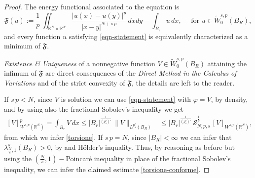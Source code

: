 \documentclass{amsart}
\theoremstyle{definition}
\numberwithin{equation}{section}
\begin{document}
\begin{proof}
	The energy functional associated to the equation is 
	\[
	\mathfrak{F}(u) := \frac{1}{p}\,\iint_{\mathbb{R}^N \times \mathbb{R}^N} \frac{|u(x) - u(y)|^p}{|x-y|^{N+s\,p}} \,dxdy - \int_{B_r} u\,dx, \quad \mbox{ for } u \in \widetilde{{W}}^{s,p}_0(B_R),
	\]
	and every function $u$ satisfying \eqref{eqn-statement} is equivalently characterized as a minimum of $\mathfrak{F}$. 
\par 
	{\it Existence \& Uniqueness} of a nonnegative function $V \in \widetilde{{W}}^{s,p}_0(B_R)$ attaining the infimum of $\mathfrak{F}$ are direct consequences of the {\it Direct Method in the Calculus of Variations} and of the strict convexity of $\mathfrak{F}$, the details are left to the reader.
	\par 
	If $s\,p < N$, since $V$ is solution we can use \eqref{eqn-statement} with $\varphi = V$, by density, and by using also the fractional Sobolev's inequality we get
	\[
	\begin{aligned}
		[V]_{W^{s, p}(\mathbb{R}^N)}^p=\int_{B_r} V\,d x \leq |B_r|^{\frac{1}{(p^*_s)'}}\,\|V\|_{L^{p^*_s}(B_R)} & \leq |B_r|^{\frac{1}{(p^*_s)'}}\,\mathcal{S}_{N, p, s}^{\frac{1}{p}}\,[V]_{W^{s,p}(\mathbb{R}^N)},
	\end{aligned}
	\]
	from which we infer \eqref{torsione}. If $s\,p= N$, since $|B_R| < \infty$ we can infer that $\lambda_{\frac{N}{s},1}^s(B_R) > 0$, by \cite[Lemma 2.4]{BLP} and H\"older's inquality. Thus, by reasoning as before but using the $\left(\frac{N}{s}, 1\right)-$Poincar\'e inequality in place of the fractional Sobolev's inequality, we can infer the claimed estimate \eqref{torsione-conforme}.
\end{proof}
\end{document}
